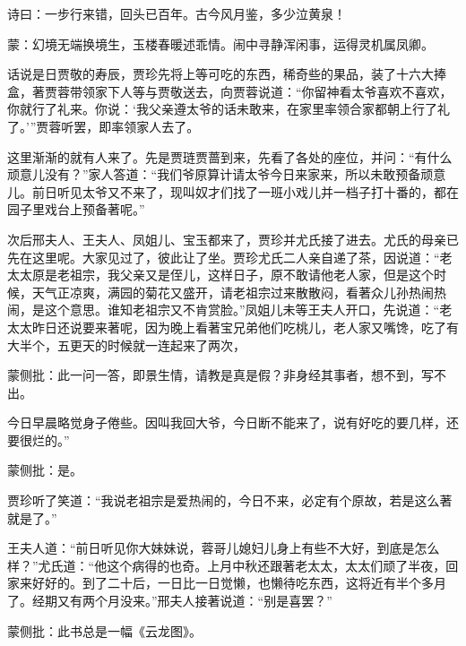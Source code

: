 
\begin{parag}
    诗曰：一步行来错，回头已百年。古今风月鉴，多少泣黄泉！
\end{parag}


\begin{parag}
    \begin{note}蒙：幻境无端换境生，玉楼春暖述乖情。闹中寻静浑闲事，运得灵机属凤卿。\end{note}
\end{parag}


\begin{parag}
    话说是日贾敬的寿辰，贾珍先将上等可吃的东西，稀奇些的果品，装了十六大捧盒，著贾蓉带领家下人等与贾敬送去，向贾蓉说道：“你留神看太爷喜欢不喜欢，你就行了礼来。你说：‘我父亲遵太爷的话未敢来，在家里率领合家都朝上行了礼了。’”贾蓉听罢，即率领家人去了。
\end{parag}


\begin{parag}
    这里渐渐的就有人来了。先是贾琏贾蔷到来，先看了各处的座位，并问：“有什么顽意儿没有？”家人答道：“我们爷原算计请太爷今日来家来，所以未敢预备顽意儿。前日听见太爷又不来了，现叫奴才们找了一班小戏儿并一档子打十番的，都在园子里戏台上预备著呢。”
\end{parag}


\begin{parag}
    次后邢夫人、王夫人、凤姐儿、宝玉都来了，贾珍并尤氏接了进去。尤氏的母亲已先在这里呢。大家见过了，彼此让了坐。贾珍尤氏二人亲自递了茶，因说道：“老太太原是老祖宗，我父亲又是侄儿，这样日子，原不敢请他老人家，但是这个时候，天气正凉爽，满园的菊花又盛开，请老祖宗过来散散闷，看著众儿孙热闹热闹，是这个意思。谁知老祖宗又不肯赏脸。”凤姐儿未等王夫人开口，先说道：“老太太昨日还说要来著呢，因为晚上看著宝兄弟他们吃桃儿，老人家又嘴馋，吃了有大半个，五更天的时候就一连起来了两次，\begin{note}蒙侧批：此一问一答，即景生情，请教是真是假？非身经其事者，想不到，写不出。\end{note}今日早晨略觉身子倦些。因叫我回大爷，今日断不能来了，说有好吃的要几样，还要很烂的。”\begin{note}蒙侧批：是。\end{note}贾珍听了笑道：“我说老祖宗是爱热闹的，今日不来，必定有个原故，若是这么著就是了。”
\end{parag}


\begin{parag}
    王夫人道：“前日听见你大妹妹说，蓉哥儿媳妇儿身上有些不大好，到底是怎么样？”尤氏道：“他这个病得的也奇。上月中秋还跟著老太太，太太们顽了半夜，回家来好好的。到了二十后，一日比一日觉懒，也懒待吃东西，这将近有半个多月了。经期又有两个月没来。”邢夫人接著说道：“别是喜罢？”\begin{note}蒙侧批：此书总是一幅《云龙图》。\end{note}
\end{parag}


